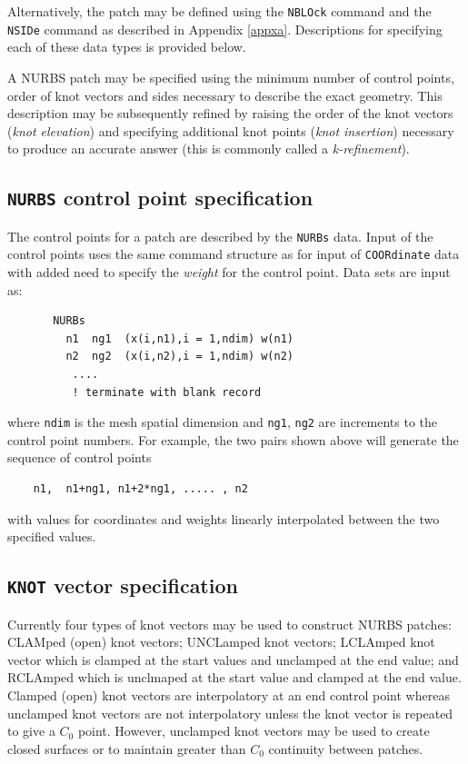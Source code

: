 Alternatively, the patch may be defined using the \texttt{NBLOck} command
and the \texttt{NSIDe} command as described in Appendix \ref{appxa}.
Descriptions for specifying each of these data types is provided below.

A NURBS patch may be specified using the minimum number of control points,
order of knot vectors and sides necessary to describe the exact geometry. 
This description may be subsequently refined by raising the order of the knot
vectors (\textit{knot elevation}) and specifying additional knot points
(\textit{knot insertion}) necessary to produce an accurate
answer (this is commonly called a \textit{k-refinement}).

\subsection{\texttt{NURBS} control point specification}

The control points for a patch are described by the \texttt{NURBs} data.  Input
of the control points uses the same command structure as for input of
\texttt{COORdinate} data with added need to specify the \textit{weight} for
the control point.  Data sets are input as:
\begin{verbatim}
       NURBs
         n1  ng1  (x(i,n1),i = 1,ndim) w(n1)
         n2  ng2  (x(i,n2),i = 1,ndim) w(n2)
          ....
          ! terminate with blank record
\end{verbatim}
where \texttt{ndim} is the mesh spatial dimension and \texttt{ng1}, \texttt{ng2}
are increments to the control point numbers.  For example, the two pairs
shown above will generate the sequence of control points
\begin{verbatim}
    n1,  n1+ng1, n1+2*ng1, ..... , n2
\end{verbatim}
with values for coordinates and weights linearly interpolated between the
two specified values.

\subsection{\texttt{KNOT} vector specification}

Currently four types of knot vectors may be used to construct NURBS patches:
CLAMped (open) knot vectors; UNCLamped knot vectors; LCLAmped knot
vector which is clamped at the start values and unclamped at the end value; and
RCLAmped which is unclmaped at the start value and clamped at the end
value.  Clamped (open) knot vectors are interpolatory at an end 
control point
whereas unclamped knot vectors are not interpolatory unless the knot vector
is repeated to give a $C_0$ point. However, unclamped knot vectors may
be used to create closed surfaces or to maintain 
greater than $C_0$ continuity between patches.

